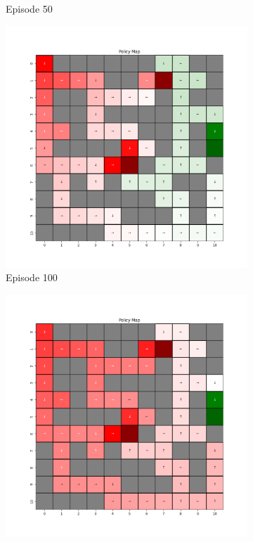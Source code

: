 \documentclass{assignment}
\begin{document}
\begin{figure}[H]
\begin{subfigure}{0.3\textwidth}
    \caption{Episode 50}
    \end{subfigure}\hfill
    \begin{subfigure}{0.3\textwidth}
        \includegraphics[width=\textwidth]{figures/policy_q/alpha_sweep/policy_alpha_0.001_gamma_0.95_epsilon_0.2_iteration_100.png}
    \caption{Episode 100}
    \end{subfigure}
    \begin{subfigure}{0.3\textwidth}
        \includegraphics[width=\textwidth]{figures/policy_q/alpha_sweep/policy_alpha_0.001_gamma_0.95_epsilon_0.2_iteration_1000.png}

\end{subfigure}
\end{figure}
\end{document}
